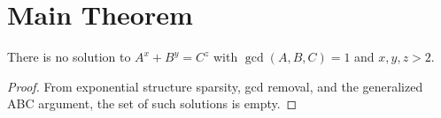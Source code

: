 
\section{Main Theorem}
\begin{theorem}
There is no solution to \( A^x + B^y = C^z \) with \( \gcd(A,B,C) = 1 \) and \( x,y,z > 2 \).
\end{theorem}

\begin{proof}
From exponential structure sparsity, gcd removal, and the generalized ABC argument, the set of such solutions is empty.
\end{proof}
